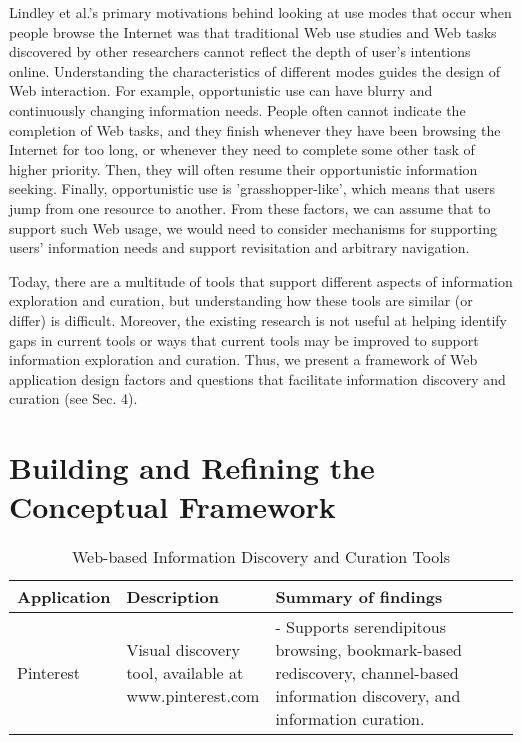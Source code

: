 \documentclass{casconpaper}
\begin{document}
{{{Lindley et al.'s primary motivations behind looking at use modes that occur when people browse the Internet was that traditional Web use studies and Web tasks discovered by other researchers cannot reflect the depth of user's intentions online. Understanding the characteristics of different modes guides the design of Web interaction. For example, opportunistic use can have blurry and continuously changing information needs. People often cannot indicate the completion of Web tasks, and they finish whenever they have been browsing the Internet for too long, or whenever they need to complete some other task of higher priority. Then, they will often resume their opportunistic information seeking. Finally, opportunistic use is 'grasshopper-like', which means that users jump from one resource to another. From these factors, we can assume that to support such Web usage, we would need to consider mechanisms for supporting users' information needs and support revisitation and arbitrary navigation.

} %

Today, there are a multitude of tools that support different aspects of information exploration and curation, but understanding how these tools are similar (or differ) is difficult. Moreover, the existing research is not useful at helping identify gaps in current tools or ways that current tools may be improved to support information
exploration and curation. Thus, we present a framework of Web application design factors and questions that facilitate information discovery and curation (see Sec. 4).
} %


{\section{Building and Refining the Conceptual Framework}
\begin{table*}[htbp]
\small

\caption{Web-based Information Discovery and Curation Tools}

\begin{tabular}{|p{0.11\linewidth}| p{0.22\linewidth}| p{0.67\linewidth}|}

\hline
Application     & Description                                                                  & Summary of findings                                                                                                                                                                                                                                                                                            
\\
\hline
Pinterest       & \raggedright
Visual discovery tool, available at www.pinterest.com                        & - Supports serendipitous browsing, bookmark-based rediscovery, channel-based information discovery, and information curation. 


\end{tabular}
\end{table*}}}
\end{document}
